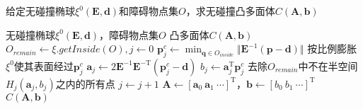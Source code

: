\documentclass[11pt]{ctexart}
\begin{document}
	\begin{algorithm}[H]
		\renewcommand{\thealgorithm}{2-3}
        \caption{给定无碰撞椭球$\xi^{0}(\mathbf{E},\mathbf{d})$和障碍物点集$O$，求无碰撞凸多面体$C(\mathbf{A},\mathbf{b})$}  
        \begin{algorithmic}[1] %
            \Require 无碰撞椭球$\xi^{0}(\mathbf{E},\mathbf{d})$，障碍物点集$O$ 
            \Ensure 凸多面体$C(\mathbf{A},\mathbf{b})$
            \STATE  $O_{remain}\gets \xi.getInside(O),j \gets 0$
				\STATE $\mathbf{p}_{j}^{c} \gets \min_{\mathbf{q} \in O_{inside}}\Vert \mathbf{E}^{-1}(\mathbf{p}-\mathbf{d}) \Vert$ 
				\STATE 按比例膨胀$\xi^{0}$使其表面经过$\mathbf{p}_{j}^{c}$
				\STATE $\mathbf{a}_{j} \gets 2\mathbf{E}^{-1}\mathbf{E}^{-\text{T}}(\mathbf{p}_{j}^{c}-\mathbf{d})$
				\STATE $b_{j} \gets \mathbf{a}_{j}^{\text{T}}\mathbf{p}_{j}^{c}$
				\STATE 去除$O_{remain}$中不在半空间$H_{j}(\mathbf{a}_{j},b_{j})$之内的所有点
				\STATE $j \gets j+1$
			\EndWhile
			\STATE $\mathbf{A} \gets [\mathbf{a}_{0}\ \mathbf{a}_{1}\ \cdots]^{\text{T}}$，$\mathbf{b} \gets [b_0 \ b_1 \ \cdots]^{\text{T}}$
			\STATE \Return $C(\mathbf{A},\mathbf{b})$
        \end{algorithmic}  
    \end{algorithm} 

	
	
\end{document}
